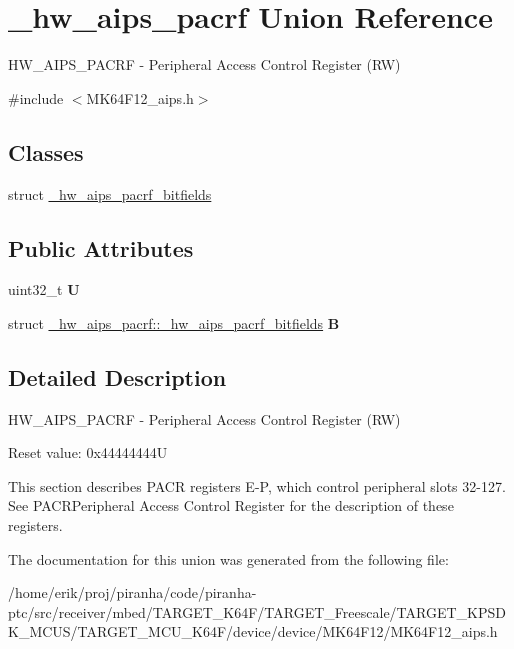 \hypertarget{union__hw__aips__pacrf}{}\section{\+\_\+hw\+\_\+aips\+\_\+pacrf Union Reference}
\label{union__hw__aips__pacrf}


H\+W\+\_\+\+A\+I\+P\+S\+\_\+\+P\+A\+C\+RF -\/ Peripheral Access Control Register (RW)  




{\ttfamily \#include $<$M\+K64\+F12\+\_\+aips.\+h$>$}

\subsection*{Classes}
\begin{DoxyCompactItemize}
\item 
struct \hyperlink{struct__hw__aips__pacrf_1_1__hw__aips__pacrf__bitfields}{\+\_\+hw\+\_\+aips\+\_\+pacrf\+\_\+bitfields}
\end{DoxyCompactItemize}
\subsection*{Public Attributes}
\begin{DoxyCompactItemize}
\item 
uint32\+\_\+t {\bfseries U}\hypertarget{union__hw__aips__pacrf_ae4d9d4d770c9c656015a4a9225534c2e}{}\label{union__hw__aips__pacrf_ae4d9d4d770c9c656015a4a9225534c2e}

\item 
struct \hyperlink{struct__hw__aips__pacrf_1_1__hw__aips__pacrf__bitfields}{\+\_\+hw\+\_\+aips\+\_\+pacrf\+::\+\_\+hw\+\_\+aips\+\_\+pacrf\+\_\+bitfields} {\bfseries B}\hypertarget{union__hw__aips__pacrf_a1129002e84db08f3b0bc5bdb0a80f99f}{}\label{union__hw__aips__pacrf_a1129002e84db08f3b0bc5bdb0a80f99f}

\end{DoxyCompactItemize}


\subsection{Detailed Description}
H\+W\+\_\+\+A\+I\+P\+S\+\_\+\+P\+A\+C\+RF -\/ Peripheral Access Control Register (RW) 

Reset value\+: 0x44444444U

This section describes P\+A\+CR registers E-\/P, which control peripheral slots 32-\/127. See P\+A\+C\+R\+Peripheral Access Control Register for the description of these registers. 

The documentation for this union was generated from the following file\+:\begin{DoxyCompactItemize}
\item 
/home/erik/proj/piranha/code/piranha-\/ptc/src/receiver/mbed/\+T\+A\+R\+G\+E\+T\+\_\+\+K64\+F/\+T\+A\+R\+G\+E\+T\+\_\+\+Freescale/\+T\+A\+R\+G\+E\+T\+\_\+\+K\+P\+S\+D\+K\+\_\+\+M\+C\+U\+S/\+T\+A\+R\+G\+E\+T\+\_\+\+M\+C\+U\+\_\+\+K64\+F/device/device/\+M\+K64\+F12/M\+K64\+F12\+\_\+aips.\+h\end{DoxyCompactItemize}
